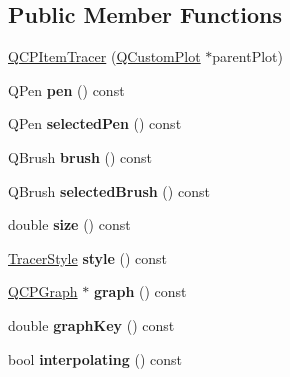\subsection*{Public Member Functions}
\begin{DoxyCompactItemize}
\item 
\hyperlink{class_q_c_p_item_tracer_adc5ca846eeac323db4aa1fc4081e36be}{Q\+C\+P\+Item\+Tracer} (\hyperlink{class_q_custom_plot}{Q\+Custom\+Plot} $\ast$parent\+Plot)
\item 
\hypertarget{class_q_c_p_item_tracer_a789cdc627868f5a4a0956816072571c9}{}\label{class_q_c_p_item_tracer_a789cdc627868f5a4a0956816072571c9} 
Q\+Pen {\bfseries pen} () const
\item 
\hypertarget{class_q_c_p_item_tracer_ad231a97bac99e01778618d1a5720b17d}{}\label{class_q_c_p_item_tracer_ad231a97bac99e01778618d1a5720b17d} 
Q\+Pen {\bfseries selected\+Pen} () const
\item 
\hypertarget{class_q_c_p_item_tracer_a6dd4660e70f58bb00390bcda56be568d}{}\label{class_q_c_p_item_tracer_a6dd4660e70f58bb00390bcda56be568d} 
Q\+Brush {\bfseries brush} () const
\item 
\hypertarget{class_q_c_p_item_tracer_ae3e48270b4a6ec20f7a9e1f63e778243}{}\label{class_q_c_p_item_tracer_ae3e48270b4a6ec20f7a9e1f63e778243} 
Q\+Brush {\bfseries selected\+Brush} () const
\item 
\hypertarget{class_q_c_p_item_tracer_a4e42d7b49f293273a74a49a2457856e2}{}\label{class_q_c_p_item_tracer_a4e42d7b49f293273a74a49a2457856e2} 
double {\bfseries size} () const
\item 
\hypertarget{class_q_c_p_item_tracer_afdaee32c9ccc9c14502b28d3d86bf5ed}{}\label{class_q_c_p_item_tracer_afdaee32c9ccc9c14502b28d3d86bf5ed} 
\hyperlink{class_q_c_p_item_tracer_a2f05ddb13978036f902ca3ab47076500}{Tracer\+Style} {\bfseries style} () const
\item 
\hypertarget{class_q_c_p_item_tracer_ac6526e3e1fff79894f034823461b138a}{}\label{class_q_c_p_item_tracer_ac6526e3e1fff79894f034823461b138a} 
\hyperlink{class_q_c_p_graph}{Q\+C\+P\+Graph} $\ast$ {\bfseries graph} () const
\item 
\hypertarget{class_q_c_p_item_tracer_ac39a0791109588d11bb97cd643da2470}{}\label{class_q_c_p_item_tracer_ac39a0791109588d11bb97cd643da2470} 
double {\bfseries graph\+Key} () const
\item 
\hypertarget{class_q_c_p_item_tracer_ae9ab6d72e0a35e1769c0b5a9b58181f2}{}\label{class_q_c_p_item_tracer_ae9ab6d72e0a35e1769c0b5a9b58181f2} 
bool {\bfseries interpolating} () const

\end{DoxyCompactItemize}

